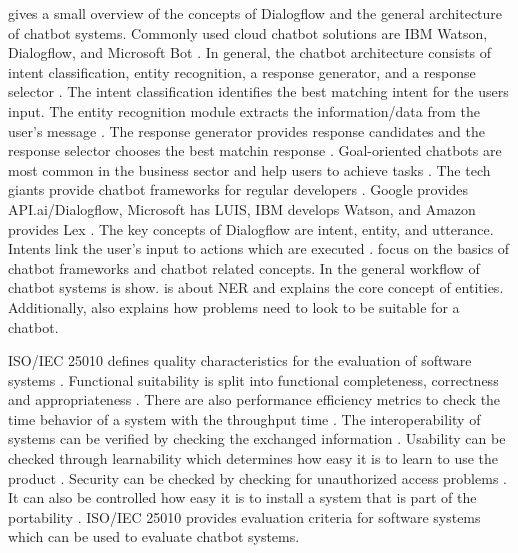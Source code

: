 \citet{rahman2017programming} gives a small overview of the concepts of Dialogflow and the general architecture of chatbot systems.
Commonly used cloud chatbot solutions are IBM Watson, Dialogflow, and Microsoft Bot \cite{rahman2017programming}.
In general, the chatbot architecture consists of intent classification, entity recognition, a response generator, 
and a response selector \cite{rahman2017programming}. 
The intent classification identifies the best matching intent for the users input.
The entity recognition module extracts the information/data from the user's message \cite{rahman2017programming}.
The response generator provides response candidates and the response selector chooses the best matchin response \cite{rahman2017programming}.
Goal-oriented chatbots are most common in the business sector and help users to achieve tasks \cite{rahman2017programming}.
The tech giants provide chatbot frameworks for regular developers \cite{rahman2017programming}.
Google provides API.ai/Dialogflow, Microsoft has LUIS, IBM develops Watson, and Amazon provides Lex \cite{rahman2017programming}.
The key concepts of Dialogflow are intent, entity, and utterance.
Intents link the user's input to actions which are executed \cite{rahman2017programming}.
\citet{deshpande2017survey,buiildChatbotsPython,geyer2016named,rahman2017programming} focus on the 
basics of chatbot frameworks and chatbot related concepts.
In \citet{deshpande2017survey, rahman2017programming} the general workflow of chatbot systems is show.
\citet{geyer2016named} is about NER and explains the core concept of entities.
Additionally, \citet{buiildChatbotsPython} also explains how problems need to look to be 
suitable for a chatbot.




ISO/IEC 25010 defines quality characteristics for the evaluation of software systems \cite{iso25010}.
Functional suitability is split into functional completeness, correctness and appropriateness \cite{iso25010}.
There are also performance efficiency metrics to check the time behavior of a system with the throughput time \cite{iso25010}.
The interoperability of systems can be verified by checking the exchanged information \cite{iso25010}.
Usability can be checked through learnability which determines how easy it is to learn to use the product \cite{iso25010}.
Security can be checked by checking for unauthorized access problems \cite{iso25010}.
It can also be controlled how easy it is to install a system that is part of the portability \cite{iso25010}.
ISO/IEC 25010 provides evaluation criteria for software systems which can be used to evaluate chatbot systems.


